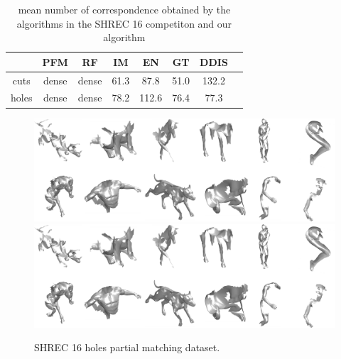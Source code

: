 \documentclass[10pt,twocolumn,letterpaper]{article}
\begin{document}
\begin{table}[h]
	\centering
	\begin{tabular}{c  c  c  c  c  c  c c} 
		\hline
		& PFM & RF & IM & EN & GT & DDIS  \\ \hline
		cuts & dense & dense & 61.3 & 87.8 & 51.0 & 132.2\\ \hline
		holes & dense & dense & 78.2 & 112.6 & 76.4 & 77.3 \\ \hline
		
	\end{tabular}
	\caption{mean number of correspondence obtained by the algorithms in the SHREC 16 competiton and our algorithm}
	\label{table:1}
\end{table}

\begin{figure}[htb]
	\centering
	\ifpdf
	\includegraphics[width=1\textwidth]{figures/Holes.png}
	\else
	\includegraphics[width=1\textwidth]{figures/Holes.png}
	\fi
	\caption{SHREC 16 holes partial matching dataset.}
\end{figure}
\end{document}
